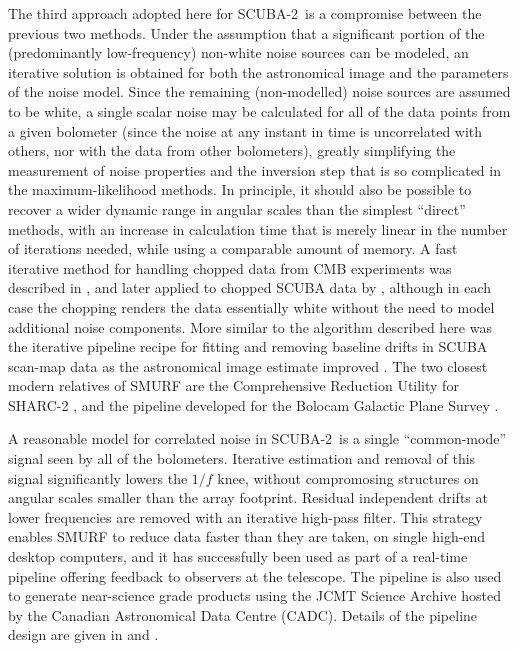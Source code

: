 \documentclass[useAMS,usenatbib,nofootinbib]{mn2e}
\newcommand{\scuba}{SCUBA-2}
\begin{document}

The third approach adopted here for \scuba\ is a compromise between
the previous two methods. Under the assumption that a significant
portion of the (predominantly low-frequency) non-white noise sources
can be modeled, an iterative solution is obtained for both the
astronomical image and the parameters of the noise model. Since the
remaining (non-modelled) noise sources are assumed to be white, a
single scalar noise may be calculated for all of the data points from
a given bolometer (since the noise at any instant in time is
uncorrelated with others, nor with the data from other bolometers),
greatly simplifying the measurement of noise properties and the
inversion step that is so complicated in the maximum-likelihood
methods. In principle, it should also be possible to recover a wider
dynamic range in angular scales than the simplest ``direct'' methods,
with an increase in calculation time that is merely linear in the
number of iterations needed, while using a comparable amount of
memory. A fast iterative method for handling chopped data from CMB
experiments was described in \citet{wright1996}, and later applied to
chopped SCUBA data by \citet{johnstone2000}, although in each case the
chopping renders the data essentially white without the need to model
additional noise components. More similar to the algorithm described
here was the iterative pipeline recipe for fitting and removing baseline drifts
in SCUBA scan-map data as the astronomical image estimate improved
\citet{1999ASPC..172..171J}. The two closest modern relatives of SMURF are the
Comprehensive Reduction Utility for SHARC-2
\citep[CRUSH,][]{kovacs2008}, and the pipeline developed for the
Bolocam Galactic Plane Survey \citep{aguirre2010}.

A reasonable model for correlated noise in \scuba\ is a single
``common-mode'' signal seen by all of the bolometers. Iterative
estimation and removal of this signal significantly lowers the $1/f$
knee, without compromosing structures on angular scales smaller than
the array footprint. Residual independent drifts at lower frequencies
are removed with an iterative high-pass filter. This strategy enables
SMURF to reduce data faster than they are taken, on single high-end
desktop computers, and it has successfully been used as part of a
real-time pipeline offering feedback to observers at the
telescope. The pipeline is also used to generate near-science grade
products using the JCMT Science Archive \citep{2011ASPC..442..203E}
hosted by the Canadian Astronomical Data Centre (CADC). Details of the
pipeline design are given in \citet{gibb2005} and
\citet{2008AN....329..295C}.
\end{document}

